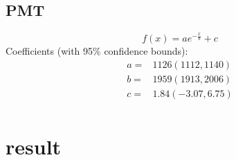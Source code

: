 \documentclass[notheorems, aspectratio=54]{beamer}
\begin{document}
\subsection{PMT}
\begin{frame}
\begin{figure}[htbp]
\centering
{}
\end{figure}

$$
    f(x) = a e^{-\frac{x}{b}}+c
$$
     Coefficients (with 95\% confidence bounds):
     \begin{align}
       a =&        1126  (1112, 1140)\nonumber\\
       b =&        1959  (1913, 2006)\nonumber\\
       c =&        1.84  (-3.07, 6.75)\nonumber\\
     \end{align}

\end{frame}

\section{result}
\end{document}

